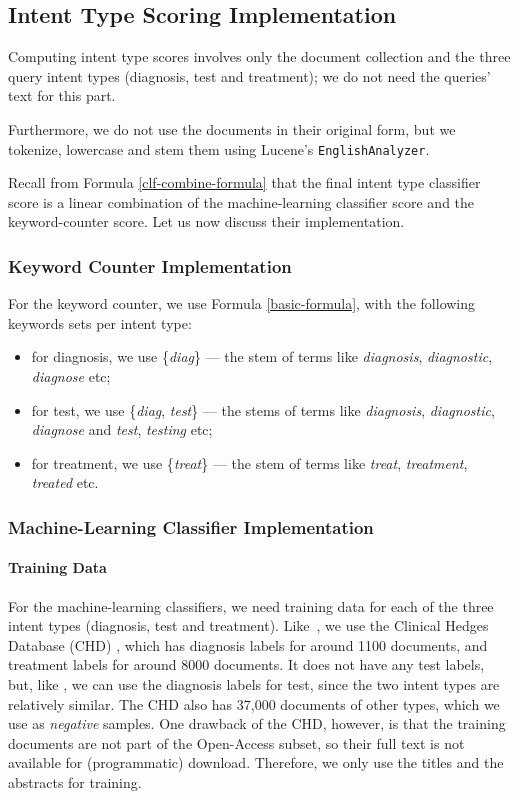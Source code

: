 \subsection{Intent Type Scoring Implementation}
Computing intent type scores involves only the document collection and the three query intent types (diagnosis, test and treatment);
we do not need the queries' text for this part.

Furthermore, we do not use the documents in their original form,
but we tokenize, lowercase and stem them using Lucene's \texttt{EnglishAnalyzer}.

Recall from Formula \ref{clf-combine-formula} that the final intent type classifier score is a linear combination of the
machine-learning classifier score and the keyword-counter score. Let us now discuss their implementation.

\subsubsection{Keyword Counter Implementation}
For the keyword counter, we use Formula \ref{basic-formula}, with the following keywords sets per intent type:
\begin{itemize}
 \item for diagnosis, we use \{\emph{diag}\} --- the stem of terms like \emph{diagnosis}, \emph{diagnostic}, \emph{diagnose} etc;
 \item for test, we use \{\emph{diag}, \emph{test}\} --- the stems of terms like \emph{diagnosis}, \emph{diagnostic}, \emph{diagnose} and
 \emph{test}, \emph{testing} etc;
 \item for treatment, we use \{\emph{treat}\} --- the stem of terms like \emph{treat}, \emph{treatment}, \emph{treated} etc.
\end{itemize}

\subsubsection{Machine-Learning Classifier Implementation}
\paragraph{Training Data}
For the machine-learning classifiers, we need training data for each of the three intent types (diagnosis, test and treatment).
Like~\cite{choi,choi-prev,FDUMedSearch}, we use the Clinical Hedges Database (CHD)
\cite{chd},
which has diagnosis labels for around 1100 documents, and treatment labels for around 8000 documents. It does
not have any test labels, but, like \cite{choi}, we can use the diagnosis labels for test, since the two intent types are relatively similar.
The CHD also has 37,000 documents of other types, which we use as \emph{negative} samples.
One drawback of the CHD, however, is that the training documents are not part of the Open-Access subset, so their full text is not
available for (programmatic) download. Therefore, we only use the titles and the abstracts for training.

